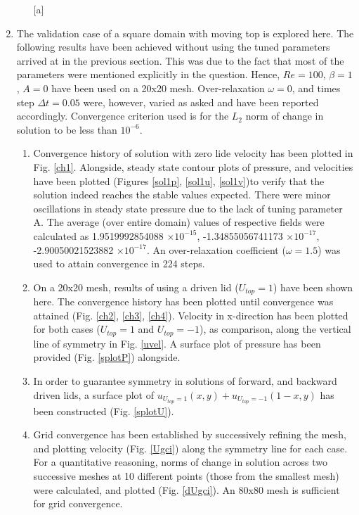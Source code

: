 \documentclass[a4paper, 10pt]{article}
\begin{document}
\begin{enumerate}[I]
\begin{enumerate} [a]


  \end{enumerate}

\item The validation case of a square domain with moving top is explored here. The following results have been achieved without using the tuned parameters arrived at in the previous section. This was due to the fact that most of the parameters were mentioned explicitly in the question. Hence, $Re = 100$, $\beta = 1$, $A = 0$ have been used on a 20x20 mesh. Over-relaxation $\omega = 0$, and times step $\Delta t = 0.05$ were, however, varied as asked and have been reported accordingly. Convergence criterion used is for the $L_2$ norm of change in solution to be less than $10^{-6}$.
  \begin{enumerate} [a]
  \item Convergence history of solution with zero lide velocity has been plotted in Fig. \ref{ch1}. Alongside, steady state contour plots of pressure, and velocities have been plotted (Figures \ref{sol1p}, \ref{sol1u}, \ref{sol1v})to verify that the solution indeed reaches the stable values expected. There were minor oscillations in steady state pressure due to the lack of tuning parameter A. The average (over entire domain) values of respective fields were calculated as 1.9519992854088 $\times 10^{-15}$, -1.34855056741173 $\times 10^{-17}$, -2.90050021523882 $\times 10^{-17}$. An over-relaxation coefficient ($\omega = 1.5$) was used to attain convergence in 224 steps.
  \item On a 20x20 mesh, results of using a driven lid ($U_{top} = 1$) have been shown here. The convergence history has been plotted until convergence was attained (Fig. \ref{ch2}, \ref{ch3}, \ref{ch4}). Velocity in x-direction has been plotted for both cases ($U_{top} = 1$ and $U_{top} = -1$), as comparison, along the vertical line of symmetry in Fig. \ref{uvel}. A surface plot of pressure has been provided (Fig. \ref{splotP}) alongside.
  \item In order to guarantee symmetry in solutions of forward, and backward driven lids, a surface plot of $u_{U_{top} = 1}(x,y) + u_{U_{top} = -1}(1-x,y)$ has been constructed (Fig. \ref{splotU}).
  \item Grid convergence has been established by successively refining the mesh, and plotting velocity (Fig. \ref{Ugci}) along the symmetry line for each case. For a quantitative reasoning, norms of change in solution across two successive meshes at 10 different points (those from the smallest mesh) were calculated, and plotted (Fig. \ref{dUgci}). An 80x80 mesh is sufficient for grid convergence.


\end{enumerate}
\end{enumerate}
\end{document}
